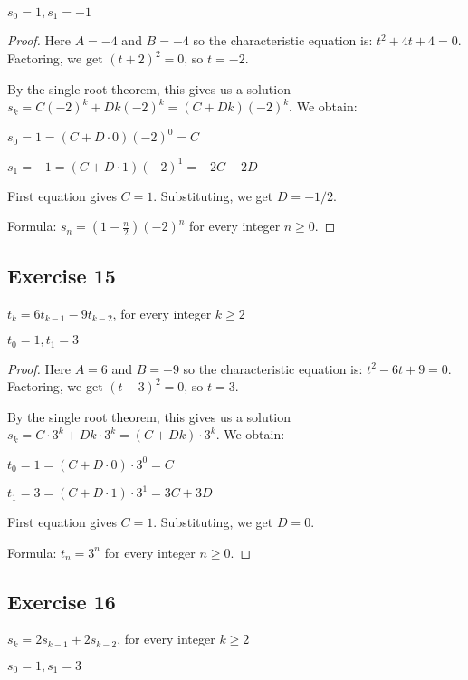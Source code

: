 \documentclass[14pt]{extarticle}
\begin{document}
\(s_0 = 1, s_1 = -1\)

\begin{proof}
    Here $A = -4$ and $B = -4$ so the characteristic equation is: \(t^2 + 4t + 4 = 0\).
    Factoring, we get \((t + 2)^2 = 0\), so $t = -2$.

    By the single root theorem, this gives us a solution \(s_k = C(-2)^k + Dk(-2)^k = (C + Dk)(-2)^k\). We obtain:

    \(s_0 = 1 = (C + D \cdot 0)(-2)^0 = C\)

    \(s_1 = -1 = (C + D \cdot 1)(-2)^1 = -2C - 2D\)

    First equation gives $C = 1$. Substituting, we get $D = -1/2$.

    Formula: \(s_n = (1 - \frac{n}{2})(-2)^n\) for every integer \(n \geq 0\).
\end{proof}

\subsection{Exercise 15}
\(t_k = 6t_{k-1} - 9t_{k-2}\), for every integer \(k \geq 2\)

\(t_0 = 1, t_1 = 3\)

\begin{proof}
    Here $A = 6$ and $B = -9$ so the characteristic equation is: \(t^2 - 6t + 9 = 0\).
    Factoring, we get \((t - 3)^2 = 0\), so $t = 3$.

    By the single root theorem, this gives us a solution \(s_k = C \cdot 3^k + Dk \cdot 3^k = (C + Dk) \cdot 3^k\).
    We obtain:

    \(t_0 = 1 = (C + D \cdot 0) \cdot 3^0 = C\)

    \(t_1 = 3 = (C + D \cdot 1) \cdot 3^1 = 3C + 3D\)

    First equation gives $C = 1$. Substituting, we get $D = 0$.

    Formula: \(t_n = 3^n\) for every integer \(n \geq 0\).
\end{proof}

\subsection{Exercise 16}
\(s_k = 2s_{k-1} + 2s_{k-2}\), for every integer \(k \geq 2\)

\(s_0 = 1, s_1 = 3\)
\end{document}
